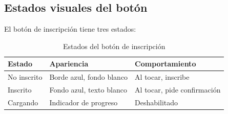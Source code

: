 \subsection{Estados visuales del bot\'on}

El bot\'on de inscripci\'on tiene tres estados:

\begin{table}[H]
\centering
\begin{tabular}{@{}lll@{}}
\toprule
\textbf{Estado} & \textbf{Apariencia} & \textbf{Comportamiento} \\
\midrule
No inscrito & Borde azul, fondo blanco & Al tocar, inscribe \\
Inscrito & Fondo azul, texto blanco & Al tocar, pide confirmaci\'on \\
Cargando & Indicador de progreso & Deshabilitado \\
\bottomrule
\end{tabular}
\caption{Estados del bot\'on de inscripci\'on}
\end{table}
